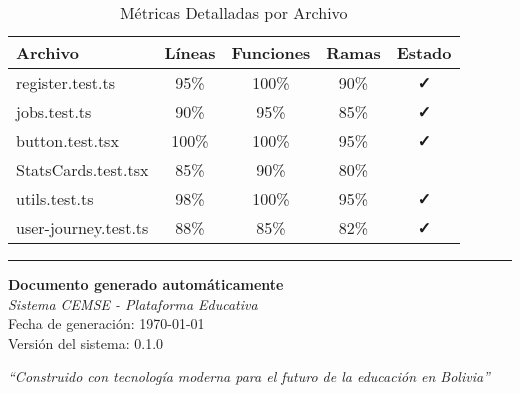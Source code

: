 \documentclass[12pt,a4paper]{article}
\begin{document}
\begin{table}[H]
\centering
\caption{Métricas Detalladas por Archivo}
\begin{tabular}{@{}lcccc@{}}
\toprule
\textbf{Archivo} & \textbf{Líneas} & \textbf{Funciones} & \textbf{Ramas} & \textbf{Estado} \\
\midrule
register.test.ts & 95\% & 100\% & 90\% & \textcolor{successgreen}{\textbf{✓}} \\
jobs.test.ts & 90\% & 95\% & 85\% & \textcolor{successgreen}{\textbf{✓}} \\
button.test.tsx & 100\% & 100\% & 95\% & \textcolor{successgreen}{\textbf{✓}} \\
StatsCards.test.tsx & 85\% & 90\% & 80\% & \textcolor{warningyellow}{\textbf{~}} \\
utils.test.ts & 98\% & 100\% & 95\% & \textcolor{successgreen}{\textbf{✓}} \\
user-journey.test.ts & 88\% & 85\% & 82\% & \textcolor{successgreen}{\textbf{✓}} \\
\bottomrule
\end{tabular}
\end{table}


\vspace{2cm}

\noindent\rule{\textwidth}{0.4pt}

\vspace{0.5cm}

\begin{center}
\textbf{Documento generado automáticamente}\\
\textit{Sistema CEMSE - Plataforma Educativa}\\
Fecha de generación: \today\\
Versión del sistema: 0.1.0\\

\vspace{1cm}

\textit{``Construido con tecnología moderna para el futuro de la educación en Bolivia''}
\end{center}
\end{document}
